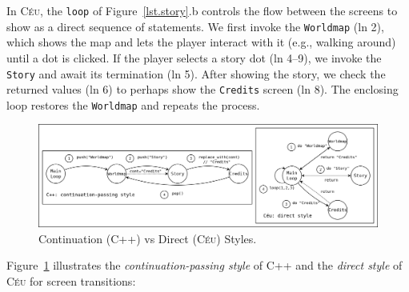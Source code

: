 \documentclass[10pt, conference, compsocconf]{IEEEtran}
\newcommand{\CEU}{\textsc{C\'{e}u}\xspace}
\newcommand{\code}[1] {{\small{\texttt{#1}}}}
\begin{document}
In \CEU, the \code{loop} of Figure~\ref{lst.story}.b controls the flow between
the screens to show as a direct sequence of statements.
%
We first invoke the \code{Worldmap} (ln 2), which shows the map and lets
the player interact with it (e.g., walking around) until a dot is clicked.
If the player selects a story dot (ln 4--9), we invoke the \code{Story}
and await its termination (ln 5).
After showing the story, we check the returned values (ln 6) to perhaps show
the \code{Credits} screen (ln 8).
The enclosing loop restores the \code{Worldmap} and repeats the process.

\begin{figure}
\centering
\includegraphics[width=\textwidth]{continuation}
\caption{ Continuation (C++) vs Direct (\CEU) Styles.
\label{fig.story}
}
\end{figure}

Figure~\ref{fig.story} illustrates the \emph{continuation-passing style} of
C++ and the \emph{direct style} of \CEU for screen transitions:
\end{document}
